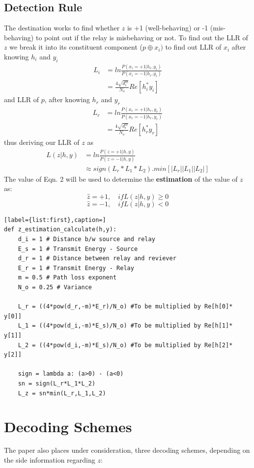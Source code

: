 \documentclass[conference]{IEEEtran}
\begin{document}
\subsection{Detection Rule}
The destination works to find whether $z$ is +1 (well-behaving) or -1 (mis-behaving) to point out if the relay is misbehaving or not. To find out the LLR of $z$ we break it into its constituent component ($p\oplus x_i)$ to find out
\newline LLR of $x_i$ after knowing $h_i$ and $y_i$
\[
\begin{split}
L_i & = ln\frac{P(x_i=+1|h_i,y_i)} {P(x_i=-1|h_i,y_i)} \\
 & = \frac{4\sqrt{d_i^m}}{N_o} Re[h_i^*y_i]
\end{split}
\]
and LLR of $p$, after knowing $h_r$ and $y_r$
\[
\begin{split}
L_r & = ln\frac{P(x_r=+1|h_r,y_r)} {P(x_r=-1|h_r,y_r)} \\
 & = \frac{4\sqrt{d_r^m}}{N_o} Re[h_r^*y_r]
\end{split}
\]
thus deriving our LLR of $z$ as
\begin{equation}
\begin{split}
L(z|h,y)& = ln\frac{P(z=+1|h,y)} {P(z=-1|h,y)} \\
 & \approx sign(L_r*L_1*L_2).min[|L_r||L_1||L_2|] 
\end{split}
\end{equation}
The value of Eqn. 2 will be used to determine the \textbf{estimation} of the value of $z$ as:
\[\hat{z}=+1, \quad if L(z|h,y)\geq 0\]
\[\hat{z}=-1, \quad if L(z|h,y)< 0\]
\begin{lstlisting}[label={list:first},caption=]
def z_estimation_calculate(h,y):
    d_i = 1 # Distance b/w source and relay
    E_s = 1 # Transmit Energy - Source
    d_r = 1 # Distance between relay and reviever
    E_r = 1 # Transmit Energy - Relay
    m = 0.5 # Path loss exponent
    N_o = 0.25 # Variance

    L_r = ((4*pow(d_r,-m)*E_r)/N_o) #To be multiplied by Re[h[0]* y[0]]
    L_1 = ((4*pow(d_i,-m)*E_s)/N_o) #To be multiplied by Re[h[1]* y[1]]
    L_2 = ((4*pow(d_i,-m)*E_s)/N_o) #To be multiplied by Re[h[2]* y[2]]

    sign = lambda a: (a>0) - (a<0)
    sn = sign(L_r*L_1*L_2)
    L_z = sn*min(L_r,L_1,L_2)
\end{lstlisting}

\section{Decoding Schemes}
The paper also places under consideration, three decoding schemes, depending on the side information regarding $z$:
\end{document}
